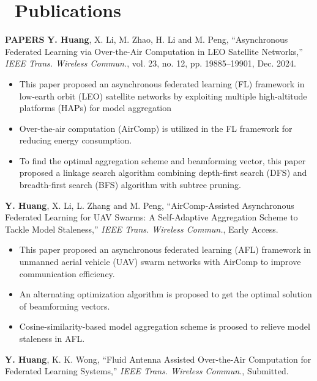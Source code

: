 \documentclass{resume}
\begin{document}
\section{\faBook\ Publications}
\textbf{PAPERS} \newline
\textbf{Y. Huang}, X. Li, M. Zhao, H. Li and M. Peng, ``Asynchronous Federated Learning via Over-the-Air Computation in LEO Satellite Networks,'' \textit{IEEE Trans. Wireless Commun.}, vol. 23, no. 12, pp. 19885--19901, Dec. 2024. 
\begin{itemize}
  \item This paper proposed an asynchronous federated learning (FL) framework in low-earth orbit (LEO) satellite networks by exploiting multiple high-altitude platforms (HAPs) for model aggregation
  \item Over-the-air computation (AirComp) is utilized in the FL framework for reducing energy consumption.
  \item To find the optimal aggregation scheme and beamforming vector, this paper proposed a  linkage search algorithm combining depth-first search (DFS) and breadth-first search (BFS) algorithm with subtree pruning.
\end{itemize}
\textbf{Y. Huang}, X. Li, L. Zhang and M. Peng, ``AirComp-Assisted Asynchronous Federated Learning for UAV Swarms: A Self-Adaptive Aggregation Scheme to Tackle Model Staleness,'' \textit{IEEE Trans. Wireless Commun.}, Early Access. 
\begin{itemize}
  \item This paper proposed an asynchronous federated learning (AFL) framework in unmanned aerial vehicle (UAV) swarm networks with AirComp to improve communication efficiency.
  \item An alternating optimization algorithm is proposed to get the optimal solution of beamforming vectors.
  \item Cosine-similarity-based model aggregation scheme is proosed to relieve model staleness in AFL.
\end{itemize}
\textbf{Y. Huang}, K. K. Wong, ``Fluid Antenna Assisted Over-the-Air Computation for Federated Learning Systems,'' \textit{IEEE Trans. Wireless Commun.}, Submitted. 
\end{document}
